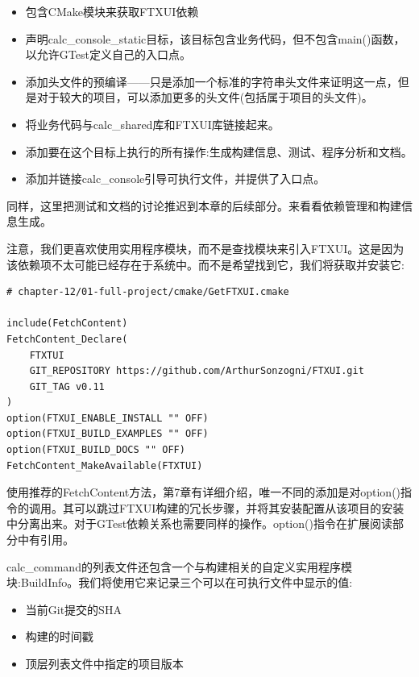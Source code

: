 \begin{itemize}
\item 
包含CMake模块来获取FTXUI依赖

\item 
声明calc\_console\_static目标，该目标包含业务代码，但不包含main()函数，以允许GTest定义自己的入口点。

\item 
添加头文件的预编译——只是添加一个标准的字符串头文件来证明这一点，但是对于较大的项目，可以添加更多的头文件(包括属于项目的头文件)。

\item 
将业务代码与calc\_shared库和FTXUI库链接起来。

\item 
添加要在这个目标上执行的所有操作:生成构建信息、测试、程序分析和文档。

\item 
添加并链接calc\_console引导可执行文件，并提供了入口点。
\end{itemize}

同样，这里把测试和文档的讨论推迟到本章的后续部分。来看看依赖管理和构建信息生成。

注意，我们更喜欢使用实用程序模块，而不是查找模块来引入FTXUI。这是因为该依赖项不太可能已经存在于系统中。而不是希望找到它，我们将获取并安装它:

\begin{lstlisting}[style=styleCMake]
# chapter-12/01-full-project/cmake/GetFTXUI.cmake

include(FetchContent)
FetchContent_Declare(
	FTXTUI
	GIT_REPOSITORY https://github.com/ArthurSonzogni/FTXUI.git
	GIT_TAG v0.11
)
option(FTXUI_ENABLE_INSTALL "" OFF)
option(FTXUI_BUILD_EXAMPLES "" OFF)
option(FTXUI_BUILD_DOCS "" OFF)
FetchContent_MakeAvailable(FTXTUI)
\end{lstlisting}

使用推荐的FetchContent方法，第7章有详细介绍，唯一不同的添加是对option()指令的调用。其可以跳过FTXUI构建的冗长步骤，并将其安装配置从该项目的安装中分离出来。对于GTest依赖关系也需要同样的操作。option()指令在扩展阅读部分中有引用。

calc\_command的列表文件还包含一个与构建相关的自定义实用程序模块:BuildInfo。我们将使用它来记录三个可以在可执行文件中显示的值:

\begin{itemize}
\item 
当前Git提交的SHA

\item 
构建的时间戳

\item 
顶层列表文件中指定的项目版本
\end{itemize}

